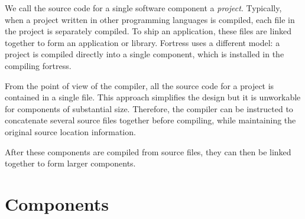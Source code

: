 %
%
%
%



We call the source code for a single software component a \emph{project}.
Typically, when a project written in other programming languages is compiled,
each file in the project is separately compiled.
To ship an application,
these files are linked together to form an application or library.
Fortress uses a different model:
a project is compiled directly into a single component,
which is installed in the compiling fortress.

From the point of view of the compiler, all the source code for a
project is contained in a single file.  This approach simplifies the design
but it is unworkable for
components of substantial size.  Therefore, the compiler can be
instructed to concatenate several source files together before
compiling, while maintaining the original source location
information.

After these components are compiled from source files, they can then
be linked together to form larger components.





\section{Components}

